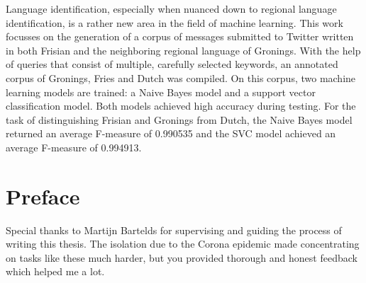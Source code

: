 \documentclass[
10pt, %
a4paper, %
oneside, %
headinclude,footinclude, %
] {book}%
\begin{document}
Language identification, especially when nuanced down to regional language identification, is a rather new area in the field of machine learning. This work focusses on the generation of a corpus of messages submitted to Twitter written in both Frisian and the neighboring regional language of Gronings. With the help of queries that consist of multiple, carefully selected keywords, an annotated corpus of Gronings, Fries and Dutch was compiled. On this corpus, two machine learning models are trained: a Naive Bayes model and a support vector classification model. Both models achieved high accuracy during testing. For the task of distinguishing Frisian and Gronings from Dutch, the Naive Bayes model returned an average F-measure of 0.990535 and the SVC model achieved an average F-measure of 0.994913.
\clearpage
\setcounter{tocdepth}{3} %
\tableofcontents %








\chapter*{Preface}

Special thanks to Martijn Bartelds for supervising and guiding the process of writing this thesis. The isolation due to the Corona epidemic made concentrating on tasks like these much harder, but you provided thorough and honest feedback which helped me a lot.





\end{document}
